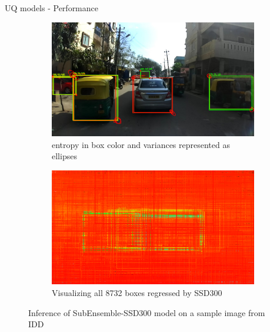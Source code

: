 \documentclass[10pt, aspectratio=169]{beamer}
\begin{document}
\begin{frame}[allowframebreaks]{UQ models - Performance}
       \begin{figure}[H]
        \captionsetup[table]{skip=0pt}
           \centering
           \begin{subfigure}[t]{0.495\textwidth}
               \centering
               \includegraphics[width=\textwidth]{images/det_images/idd_subens_variances_1.png}
               \caption{entropy in box color and variances represented as ellipses}
           \end{subfigure}
           \begin{subfigure}[t]{0.495\textwidth}
               \centering
               \includegraphics[width=\textwidth]{images/det_images/all_subens_idd_0.png}
               \caption{Visualizing all 8732 boxes regressed by SSD300}
           \end{subfigure}
           \caption{Inference of SubEnsemble-SSD300 model on a sample image from IDD}
       \end{figure}
\end{frame}
\end{document}
